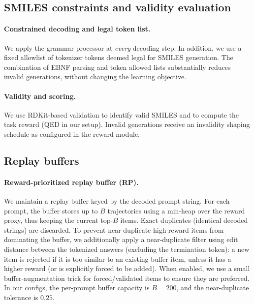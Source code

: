 \documentclass{article}
\theoremstyle{plain}
\theoremstyle{definition}
\theoremstyle{remark}
\begin{document}
\subsection{SMILES constraints and validity evaluation}
\label{app:repro_smiles_constraints}

\paragraph{Constrained decoding and legal token list.}
We apply the grammar processor at \emph{every} decoding step.
In addition, we use a fixed allowlist of tokenizer tokens deemed legal for SMILES generation.
The combination of EBNF parsing and token allowed lists substantially reduces invalid generations,
without changing the learning objective.

\paragraph{Validity and scoring.}
We use RDKit-based validation to identify valid SMILES and to compute the task reward (QED in our setup).
Invalid generations receive an invalidity shaping schedule as configured in the reward module.

\subsection{Replay buffers}
\label{app:repro_replay_impl}

\paragraph{Reward-prioritized replay buffer (RP).}
We maintain a replay buffer keyed by the decoded prompt string.
For each prompt, the buffer stores up to $B$ trajectories using a min-heap over the reward proxy, thus keeping the current top-$B$ items.
Exact duplicates (identical decoded strings) are discarded.
To prevent near-duplicate high-reward items from dominating the buffer, we additionally apply a
near-duplicate filter using edit distance between the tokenized answers (excluding the termination token):
a new item is rejected if it is too similar to an existing buffer item, unless it has a higher reward
(or is explicitly forced to be added).
When enabled, we use a small buffer-augmentation trick for forced/validated items to ensure they are preferred.
In our configs, the per-prompt buffer capacity is $B=200$, and the near-duplicate tolerance is $0.25$.
\end{document}
